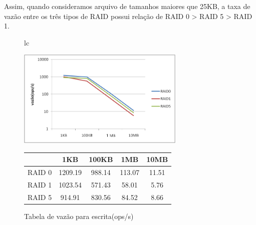 	Assim, quando consideramos arquivo de tamanhos maiores que 25KB, a taxa de vazão entre os três tipos de RAID possui relação de RAID 0 > RAID 5 > RAID 1.
	\\
	
	\begin{figure}[h]
		\begin{tabular}{lc}
			\begin{minipage}{.50\textwidth}
				\begin{center}
					
					\includegraphics[clip,width=8.0cm]{images/resultados/throughput_escrita.png}
					\caption{Gráfico de vazão para escrita}
					\label{fig:throughput_e}
					
				\end{center}
				
			\end{minipage}
			
			\begin{minipage}{.5\textwidth}
				\makeatletter
				\def\@captype{table}
				\makeatother
				\caption{Tabela de vazão para escrita(ops/s)}
				\label{tab:throughput_e}
				\begin{center}
					\begin{tabular}{|c|c|c|c|c|} \hline
						& 1KB & 100KB & 1MB & 10MB \\ \hline
						
						RAID 0	& 1209.19 & 988.14 & 113.07 & 11.51\\ \hline
						RAID 1	& 1023.54 & 571.43 & 58.01  & 5.76 \\ \hline
						RAID 5	& 914.91  & 830.56 & 84.52  & 8.66 \\ \hline
						
						
					\end{tabular}
				\end{center}
				
			\end{minipage}
		\end{tabular}
	\end{figure}
	
